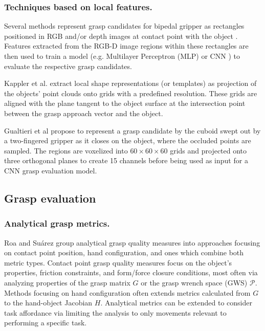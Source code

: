 \documentclass[runningheads]{../llncs}
\begin{document}
\subsubsection{Techniques based on local features.}

Several methods represent grasp candidates for bipedal gripper as rectangles positioned in RGB and/or depth images at
contact point with the object \cite{jiang2011,Detry2012,lenz2015}. Features extracted from the RGB-D image regions
within these rectangles are then used to train a model (e.g. Multilayer Perceptron (MLP) \cite{lenz2015} or CNN
\cite{jiang2011}) to evaluate the respective grasp candidates.

Kappler et al. \cite{Kappler2015} extract local shape representations (or templates) as projection of the objects'
point clouds onto grids with a predefined resolution. These grids are aligned with the plane tangent to the object
surface at the intersection point between the grasp approach vector and the object.

Gualtieri et al \cite{Gualtieri2016} propose to represent a grasp candidate by the cuboid swept out by a two-fingered
gripper as it closes on the object, where the occluded points are sampled. The regions are voxelized into $60 \times 60
\times 60$ grids and projected onto three orthogonal planes to create 15 channels before being used as input for a CNN
grasp evaluation model.

\subsection{Grasp evaluation} \label{subsec:grasp_evaluation}

\subsubsection*{Analytical grasp metrics.}

Roa and Su{\'a}rez \cite{Roa2015} group analytical grasp quality measures into approaches focusing on contact point
position, hand configuration, and ones which combine both metric types. Contact point grasp quality measures focus on
the object's properties, friction constraints, and form/force closure conditions, most often via analyzing properties
of the grasp matrix $ G $ or the grasp wrench space (GWS) $ \mathcal{P} $. Methods focusing on hand configuration often
extends metrics calculated from $ G $ to the hand-object Jacobian $ H $. Analytical metrics can be extended to consider
task affordance via limiting the analysis to only movements relevant to performing a specific task.
\end{document}
